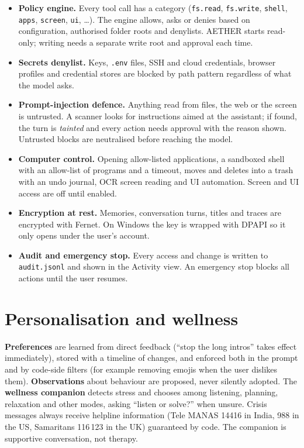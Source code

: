 \documentclass[11pt,a4paper]{article}
\newcommand{\code}[1]{\texttt{#1}}
\begin{document}
\begin{itemize}
  \item \textbf{Policy engine.} Every tool call has a category (\code{fs.read}, \code{fs.write}, \code{shell}, \code{apps}, \code{screen}, \code{ui}, \ldots). The engine allows, asks or denies based on configuration, authorised folder roots and denylists. AETHER starts read-only; writing needs a separate write root and approval each time.
  \item \textbf{Secrets denylist.} Keys, \code{.env} files, SSH and cloud credentials, browser profiles and credential stores are blocked by path pattern regardless of what the model asks.
  \item \textbf{Prompt-injection defence.} Anything read from files, the web or the screen is untrusted. A scanner looks for instructions aimed at the assistant; if found, the turn is \emph{tainted} and every action needs approval with the reason shown. Untrusted blocks are neutralised before reaching the model.
  \item \textbf{Computer control.} Opening allow-listed applications, a sandboxed shell with an allow-list of programs and a timeout, moves and deletes into a trash with an undo journal, OCR screen reading and UI automation. Screen and UI access are off until enabled.
  \item \textbf{Encryption at rest.} Memories, conversation turns, titles and traces are encrypted with Fernet. On Windows the key is wrapped with DPAPI so it only opens under the user's account.
  \item \textbf{Audit and emergency stop.} Every access and change is written to \code{audit.jsonl} and shown in the Activity view. An emergency stop blocks all actions until the user resumes.
\end{itemize}

\section{Personalisation and wellness}

\textbf{Preferences} are learned from direct feedback (``stop the long intros'' takes effect immediately), stored with a timeline of changes, and enforced both in the prompt and by code-side filters (for example removing emojis when the user dislikes them). \textbf{Observations} about behaviour are proposed, never silently adopted. The \textbf{wellness companion} detects stress and chooses among listening, planning, relaxation and other modes, asking ``listen or solve?'' when unsure. Crisis messages always receive helpline information (Tele MANAS 14416 in India, 988 in the US, Samaritans 116\,123 in the UK) guaranteed by code. The companion is supportive conversation, not therapy.
\end{document}
